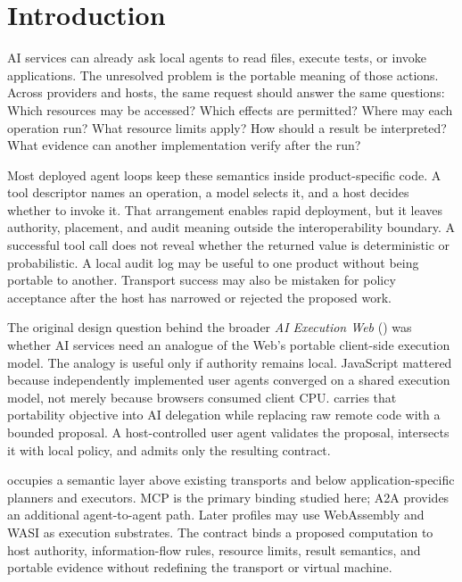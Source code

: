 \section{Introduction}
\label{sec:introduction}

 AI services can already ask local agents to read files, execute tests, or invoke applications. The unresolved problem is the portable meaning of those actions. Across providers and hosts, the same request should answer the same questions: Which resources may be accessed? Which effects are permitted? Where may each operation run? What resource limits apply? How should a result be interpreted? What evidence can another implementation verify after the run?

Most deployed agent loops keep these semantics inside product-specific code. A tool descriptor names an operation, a model selects it, and a host decides whether to invoke it. That arrangement enables rapid deployment, but it leaves authority, placement, and audit meaning outside the interoperability boundary. A successful tool call does not reveal whether the returned value is deterministic or probabilistic. A local audit log may be useful to one product without being portable to another. Transport success may also be mistaken for policy acceptance after the host has narrowed or rejected the proposed work.

The original design question behind the broader \emph{AI Execution Web} (\AIEW) was whether AI services need an analogue of the Web's portable client-side execution model. The analogy is useful only if authority remains local. JavaScript mattered because independently implemented user agents converged on a shared execution model, not merely because browsers consumed client CPU. \AUEC carries that portability objective into AI delegation while replacing raw remote code with a bounded proposal. A host-controlled user agent validates the proposal, intersects it with local policy, and admits only the resulting contract.

\AUEC occupies a semantic layer above existing transports and below application-specific planners and executors. MCP is the primary binding studied here; A2A provides an additional agent-to-agent path. Later profiles may use WebAssembly and WASI as execution substrates. The contract binds a proposed computation to host authority, information-flow rules, resource limits, result semantics, and portable evidence without redefining the transport or virtual machine.

